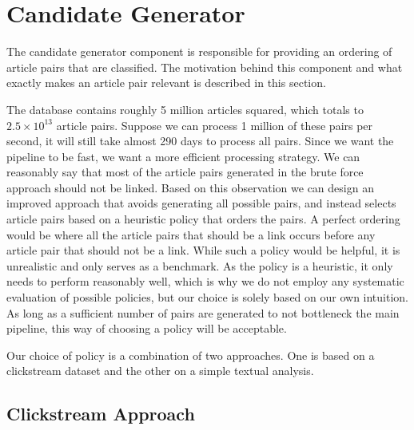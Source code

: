 \section{Candidate Generator}

The candidate generator component is responsible for providing an ordering of article pairs that are classified. The motivation behind this component and what exactly makes an article pair relevant is described in this section.

The database contains roughly 5 million articles squared, which totals to $2.5 \times 10^{13}$ article pairs. Suppose we can process 1 million of these pairs per second, it will still take almost 290 days to process all pairs. Since we want the pipeline to be fast, we want a more efficient processing strategy. We can reasonably say that most of the article pairs generated in the brute force approach should not be linked. Based on this observation we can design an improved approach that avoids generating all possible pairs, and instead selects article pairs based on a heuristic policy that orders the pairs. A perfect ordering would be where all the article pairs that should be a link occurs before any article pair that should not be a link. While such a policy would be helpful, it is unrealistic and only serves as a benchmark. As the policy is a heuristic, it only needs to perform reasonably well, which is why we do not employ any systematic evaluation of possible policies, but our choice is solely based on our own intuition. As long as a sufficient number of pairs are generated to not bottleneck the main pipeline, this way of choosing a policy will be acceptable.

Our choice of policy is a combination of two approaches. One is based on a clickstream dataset and the other on a simple textual analysis.

\subsection{Clickstream Approach}

